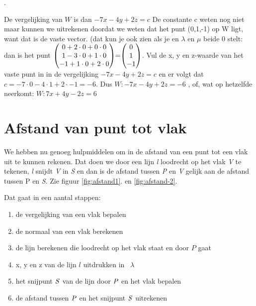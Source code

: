 .


De vergelijking van $ W $ is dan  $ -7x-4y+2z = c $ De constante c weten nog niet maar kunnen we uitrekenen doordat we weten dat het punt (0,1,-1) op W ligt, want dat is de vaste vector. (dat kun je ook zien als je en $ \lambda $  en $ \mu $  beide 0 stelt: dan is het punt $\vecdrie{0 +2\cdot0 +0\cdot0}{1 -3\cdot0 +1\cdot0}{-1 + 1\cdot0 + 2\cdot0} = \vecdrie{0}{1}{-1} $.
Vul de x, y en z-waarde van het vaste punt  in in de vergelijking $ -7x-4y+2z = c $ en er volgt dat $c = -7\cdot0-4\cdot1+2\cdot-1 = -6$. Dus $ W: -7x-4y+2z = -6 $ , of, wat op hetzelfde neerkomt:  $ W: 7x+4y-2z = 6 $

\section{Afstand van punt tot vlak}
We hebben nu genoeg hulpmiddelen om in \RD de afstand van een punt tot een vlak uit te kunnen rekenen. Dat doen we   door een lijn \textit{l} loodrecht op het vlak \textit{V} te tekenen,\textit{ l }snijdt \textit{V} in\textit{ S} en dan is de afstand tussen \textit{P} en \textit{V} gelijk aan de afstand tussen P\textit{} en \textit{S}. Zie figuur   \ref{fig:afstand1}. en \ref{fig:afstand-2}.

Dat gaat in een aantal stappen:
\begin{enumerate}[label=(\alph*)]
	\item de vergelijking van een vlak bepalen
	\item de normaal van een vlak berekenen
	\item de lijn berekenen die  loodrecht op het vlak staat  en door $ P $ gaat
	\item x, y en z van de lijn $  l $  uitdrukken in \ $  \lambda $
	\item het snijpunt $\it{S}$  van de lijn door $\it{P}$  en het vlak bepalen
	\item  de afstand tussen $\it{P}$  en het snijpunt $\it{S}$  uitrekenen
\end{enumerate}	

